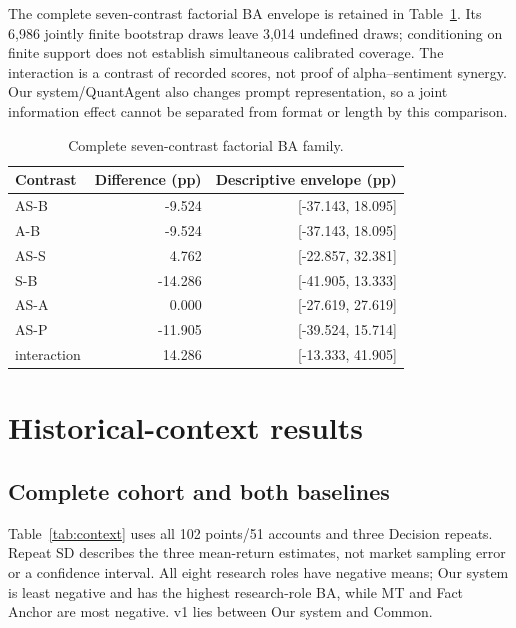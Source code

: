 The complete seven-contrast factorial BA envelope is retained in
Table~\ref{tab:factorial}. Its 6,986 jointly finite bootstrap draws leave
3,014 undefined draws; conditioning on finite support does not establish
simultaneous calibrated coverage. The interaction is a contrast of
recorded scores, not proof of alpha--sentiment synergy. Our system/QuantAgent also
changes prompt representation, so a joint information effect cannot be
separated from format or length by this comparison.

\begin{table}[!htb]\centering\small{}\setlength{\tabcolsep}{4pt}
\caption[Complete factorial BA family]{Complete seven-contrast factorial BA family.}\label{tab:factorial}
\begin{tabular}{@{}l rr@{}}\toprule
Contrast & Difference (pp) & Descriptive envelope (pp)\\\midrule
AS-B & -9.524 & {[}-37.143, 18.095{]}\\
A-B & -9.524 & {[}-37.143, 18.095{]}\\
AS-S & 4.762 & {[}-22.857, 32.381{]}\\
S-B & -14.286 & {[}-41.905, 13.333{]}\\
AS-A & 0.000 & {[}-27.619, 27.619{]}\\
AS-P & -11.905 & {[}-39.524, 15.714{]}\\
interaction & 14.286 & {[}-13.333, 41.905{]}\\
\bottomrule\end{tabular}\end{table}

\section{Historical-context results}\label{s:3fa11476b5d5815b}
\subsection{Complete cohort and both baselines}
Table~\ref{tab:context} uses all 102 points/51 accounts and three Decision
repeats. Repeat SD describes the three mean-return estimates, not market
sampling error or a confidence interval. All eight research roles have
negative means; Our system is least negative and has the highest research-role
BA, while MT and Fact Anchor are most negative. v1 lies between Our system
and Common.

